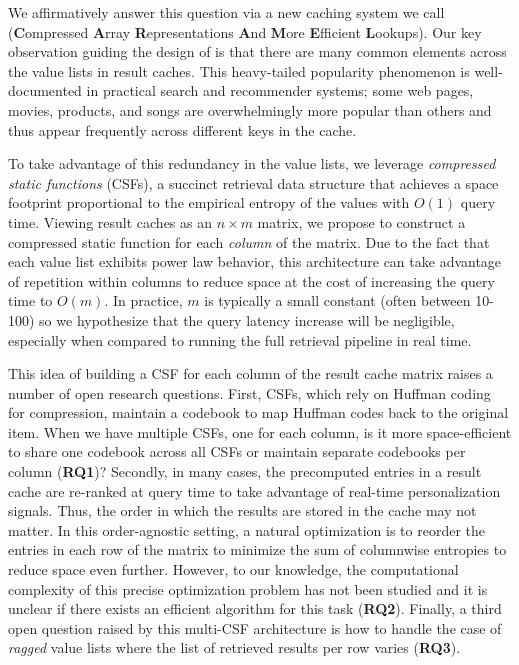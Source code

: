 We affirmatively answer this question via a new caching system we call \sys (\textbf{C}ompressed \textbf{A}rray \textbf{R}epresentations \textbf{A}nd \textbf{M}ore \textbf{E}fficient \textbf{L}ookups). Our key observation guiding the design of \sys is that there are many common elements across the value lists in result caches. This heavy-tailed popularity phenomenon is well-documented in practical search and recommender systems; some web pages, movies, products, and songs are overwhelmingly more popular than others and thus appear frequently across different keys in the cache. 

To take advantage of this redundancy in the value lists, we leverage \emph{compressed static functions} (CSFs), a succinct retrieval data structure that achieves a space footprint proportional to the empirical entropy of the values with $O(1)$ query time. Viewing result caches as an $n \times m$ matrix, we propose to construct a compressed static function for each \emph{column} of the matrix. Due to the fact that each value list exhibits power law behavior, this architecture can take advantage of repetition within columns to reduce space at the cost of increasing the query time to $O(m)$. In practice, $m$ is typically a small constant (often between 10-100) so we hypothesize that the query latency increase will be negligible, especially when compared to running the full retrieval pipeline in real time.

This idea of building a CSF for each column of the result cache matrix raises a number of open research questions. First, CSFs, which rely on Huffman coding for compression, maintain a codebook to map Huffman codes back to the original item. When we have multiple CSFs, one for each column, is it more space-efficient to share one codebook across all CSFs or maintain separate codebooks per column (\textbf{RQ1})? Secondly, in many cases, the precomputed entries in a result cache are re-ranked at query time to take advantage of real-time personalization signals. Thus, the order in which the results are stored in the cache may not matter. In this order-agnostic setting, a natural optimization is to reorder the entries in each row of the matrix to minimize the sum of columnwise entropies to reduce space even further. However, to our knowledge, the computational complexity of this precise optimization problem has not been studied and it is unclear if there exists an efficient algorithm for this task (\textbf{RQ2}). Finally, a third open question raised by this multi-CSF architecture is how to handle the case of \emph{ragged} value lists where the list of retrieved results per row varies (\textbf{RQ3}).


